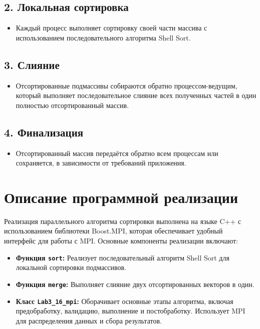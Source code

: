\documentclass[12pt]{article}
\begin{document}
\subsection*{2. Локальная сортировка}
\begin{itemize}
    \item Каждый процесс выполняет сортировку своей части массива с использованием последовательного алгоритма Shell Sort.
\end{itemize}

\subsection*{3. Слияние}
\begin{itemize}
    \item Отсортированные подмассивы собираются обратно процессом-ведущим, который выполняет последовательное слияние всех полученных частей в один полностью отсортированный массив.
\end{itemize}

\subsection*{4. Финализация}
\begin{itemize}
    \item Отсортированный массив передаётся обратно всем процессам или сохраняется, в зависимости от требований приложения.
\end{itemize}

\section*{Описание программной реализации}
Реализация параллельного алгоритма сортировки выполнена на языке C++ с использованием библиотеки Boost.MPI, которая обеспечивает удобный интерфейс для работы с MPI. Основные компоненты реализации включают:

\begin{itemize}
    \item \textbf{Функция \texttt{sort}:} Реализует последовательный алгоритм Shell Sort для локальной сортировки подмассивов.
    \item \textbf{Функция \texttt{merge}:} Выполняет слияние двух отсортированных векторов в один.
    \item \textbf{Класс \texttt{Lab3\_16\_mpi}:} Оборачивает основные этапы алгоритма, включая предобработку, валидацию, выполнение и постобработку. Использует MPI для распределения данных и сбора результатов.
\end{itemize}
\end{document}
